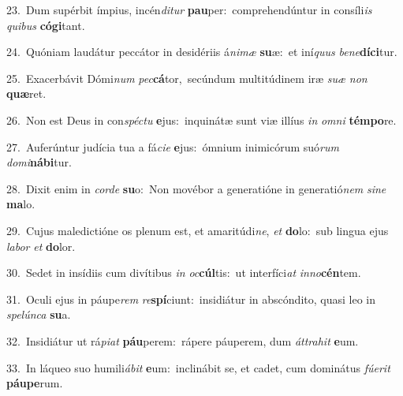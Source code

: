 {\numbfont\textcolor{\numbcolor}{23.}}~Dum supérbit ímpius, incén\-\textit{di}\-\textit{tur} \textbf{pau}\-per:~\star comprehendúntur in consíli\textit{is} \textit{qui}\-\textit{bus} \textbf{có}\-\textbf{gi}tant.\par
{\numbfont\textcolor{\numbcolor}{24.}}~Quóniam laudátur peccátor in desidériis á\-\textit{ni}\-\textit{mæ} \textbf{su}\-æ:~\star et iní\textit{quus} \textit{be}\-\textit{ne}\textbf{dí}\textbf{ci}tur.\par
{\numbfont\textcolor{\numbcolor}{25.}}~Exacerbávit Dómi\textit{num} \textit{pec}\-\textbf{cá}tor,~\star secúndum multitúdinem iræ \textit{su}\-\textit{æ} \textit{non} \textbf{quæ}\-ret.\par
{\numbfont\textcolor{\numbcolor}{26.}}~Non est Deus in con\-\textit{spéc}\-\textit{tu} \textbf{e}\-jus:~\star inquinátæ sunt viæ illíus \textit{in} \textit{om}\-\textit{ni} \textbf{tém}\-\textbf{po}re.\par
{\numbfont\textcolor{\numbcolor}{27.}}~Auferúntur judícia tua a fá\-\textit{ci}\-\textit{e} \textbf{e}\-jus:~\star ómnium inimicórum suó\textit{rum} \textit{do}\-\textit{mi}\textbf{ná}\textbf{bi}tur.\par
{\numbfont\textcolor{\numbcolor}{28.}}~Dixit enim in \textit{cor}\-\textit{de} \textbf{su}\-o:~\star Non movébor a generatióne in generatió\textit{nem} \textit{si}\-\textit{ne} \textbf{ma}\-lo.\par
{\numbfont\textcolor{\numbcolor}{29.}}~Cujus maledictióne os plenum est, et amaritúdi\-\textit{ne}\-, \textit{et} \textbf{do}\-lo:~\star sub lingua ejus \textit{la}\-\textit{bor} \textit{et} \textbf{do}\-lor.\par
{\numbfont\textcolor{\numbcolor}{30.}}~Sedet in insídiis cum divítibus \textit{in} \textit{oc}\-\textbf{cúl}tis:~\star ut interfíci\textit{at} \textit{in}\-\textit{no}\textbf{cén}tem.\par
{\numbfont\textcolor{\numbcolor}{31.}}~Oculi ejus in páupe\textit{rem} \textit{re}\-\textbf{spí}ciunt:~\star insidiátur in abscóndito, quasi leo in \textit{spe}\-\textit{lún}\textit{ca} \textbf{su}\-a.\par
{\numbfont\textcolor{\numbcolor}{32.}}~Insidiátur ut rá\-\textit{pi}\-\textit{at} \textbf{páu}\-perem:~\star rápere páuperem, dum \textit{át}\-\textit{tra}\textit{hit} \textbf{e}\-um.\par
{\numbfont\textcolor{\numbcolor}{33.}}~In láqueo suo humili\-\textit{á}\-\textit{bit} \textbf{e}\-um:~\star inclinábit se, et cadet, cum dominátus \textit{fú}\-\textit{e}\textit{rit} \textbf{páu}\-\textbf{pe}rum.\par
